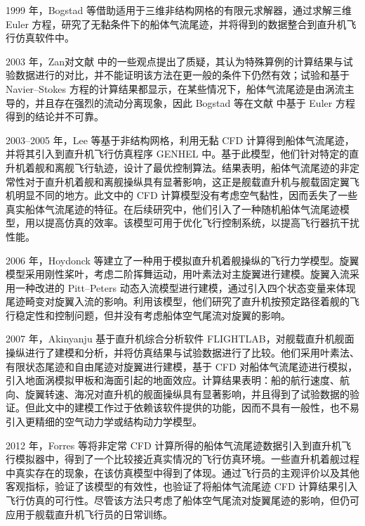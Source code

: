 1999 年，Bogstad 等借助适用于三维非结构网格的有限元求解器，通过求解三维
Euler 方程，研究了无黏条件下的船体气流尾迹，并将得到的数据整合到直升机飞行仿真软件中。

2003 年，Zan对文献 \cite{Bogstad2002} 中的一些观点提出了质疑，其认为特殊算例的计算结果与试验数据进行的对比，并不能证明该方法在更一般的条件下仍然有效；试验和基于
Navier–Stokes 方程的计算结果都显示，在某些情况下，船体气流尾迹是由涡流主导的，并且存在强烈的流动分离现象，因此 Bogstad
等在文献 \cite{Bogstad2002} 中基于 Euler 方程得到的结论并不可靠。

\newpage{}

2003–2005 年，Lee 等基于非结构网格，利用无黏 CFD 计算得到船体气流尾迹，并将其引入到直升机飞行仿真程序
GENHEL 中。基于此模型，他们针对特定的直升机着舰和离舰飞行轨迹，设计了最优控制算法。结果表明，船体气流尾迹的非定常性对于直升机着舰和离舰操纵具有显著影响，这正是舰载直升机与舰载固定翼飞机明显不同的地方。此文中的
CFD 计算模型没有考虑空气黏性，因而丢失了一些真实船体气流尾迹的特征。在后续研究中，他们引入了一种随机船体气流尾迹模型，用以提高仿真的效率。该模型可用于优化飞行控制系统，以提高飞行器抗干扰性能。

2006 年，Hoydonck 等建立了一种用于模拟直升机着舰操纵的飞行力学模型。旋翼模型采用刚性桨叶，考虑二阶挥舞运动，用叶素法对主旋翼进行建模。旋翼入流采用一种改进的
Pitt–Peters 动态入流模型进行建模，通过引入四个状态变量来体现尾迹畸变对旋翼入流的影响。利用该模型，他们研究了直升机按预定路径着舰的飞行稳定性和控制问题，但并没有考虑船体空气尾流对旋翼的影响。

2007 年，Akinyanju 基于直升机综合分析软件 FLIGHTLAB，对舰载直升机舰面操纵进行了建模和分析，并将仿真结果与试验数据进行了比较。他们采用叶素法、有限状态尾迹和自由尾迹对旋翼进行建模，基于
CFD 对船体气流尾迹进行模拟，引入地面涡模拟甲板和海面引起的地面效应。计算结果表明：船的航行速度、航向、旋翼转速、海况对直升机的舰面操纵具有显著影响，并且得到了试验数据的验证。但此文中的建模工作过于依赖该软件提供的功能，因而不具有一般性，也不易引入更精细的空气动力学或结构动力学模型。

2012 年，Forres 等将非定常 CFD 计算所得的船体气流尾迹数据引入到直升机飞行模拟器中，得到了一个比较接近真实情况的飞行仿真环境。一些直升机着舰过程中真实存在的现象，在该仿真模型中得到了体现。通过飞行员的主观评价以及其他客观指标，验证了该模型的有效性，也验证了将船体气流尾迹
CFD 计算结果引入飞行仿真的可行性。尽管该方法只考虑了船体空气尾流对旋翼尾迹的影响，但仍可应用于舰载直升机飞行员的日常训练。

